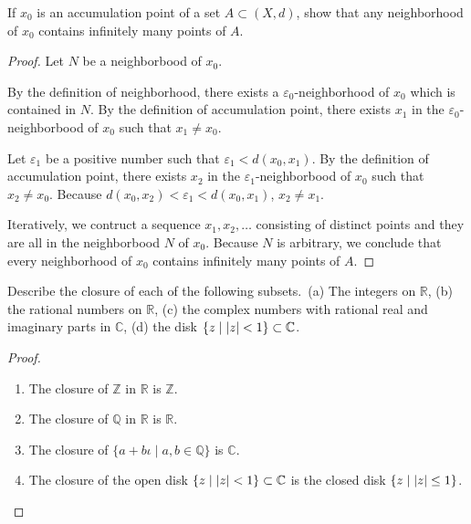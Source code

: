 \begin{exercise}\label{chapter1:section3:exercise6}
    If $x_{0}$ is an accumulation point of a set $A \subset (X, d)$, show that any neighborhood of $x_{0}$ contains infinitely many points of $A$.
\end{exercise}

\begin{proof}
    Let $N$ be a neighborbood of $x_{0}$.

    By the definition of neighborhood, there exists a $\varepsilon_{0}$-neighborhood of $x_{0}$ which is contained in $N$. By the definition of accumulation point, there exists $x_{1}$ in the $\varepsilon_{0}$-neighborbood of $x_{0}$ such that $x_{1}\ne x_{0}$.

    Let $\varepsilon_{1}$ be a positive number such that $\varepsilon_{1} < d(x_{0}, x_{1})$. By the definition of accumulation point, there exists $x_{2}$ in the $\varepsilon_{1}$-neighborbood of $x_{0}$ such that $x_{2}\ne x_{0}$. Because $d(x_{0}, x_{2}) < \varepsilon_{1} < d(x_{0}, x_{1})$, $x_{2}\ne x_{1}$.

    Iteratively, we contruct a sequence $x_{1}, x_{2}, \ldots$ consisting of distinct points and they are all in the neighborbood $N$ of $x_{0}$. Because $N$ is arbitrary, we conclude that every neighborhood of $x_{0}$ contains infinitely many points of $A$.
\end{proof}

\begin{exercise}\label{chapter1:section3:exercise7}
    Describe the closure of each of the following subsets.\ (a) The integers on $\mathbb{R}$, (b) the rational numbers on $\mathbb{R}$, (c) the complex numbers with rational real and imaginary parts in $\mathbb{C}$, (d) the disk $\{ z \mid \left\vert{z}\right\vert < 1 \}\subset \mathbb{C}$.
\end{exercise}

\begin{proof}
    \begin{enumerate}[label={(\alph*)}]
        \item The closure of $\mathbb{Z}$ in $\mathbb{R}$ is $\mathbb{Z}$.
        \item The closure of $\mathbb{Q}$ in $\mathbb{R}$ is $\mathbb{R}$.
        \item The closure of $\{ a + b\iota \mid a, b\in\mathbb{Q} \}$ is $\mathbb{C}$.
        \item The closure of the open disk $\{ z \mid \left\vert{z}\right\vert < 1 \}\subset \mathbb{C}$ is the closed disk $\{ z \mid \left\vert{z}\right\vert\leq 1 \}$.
    \end{enumerate}
\end{proof}

